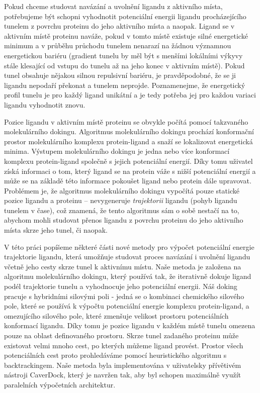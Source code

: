 Pokud chceme studovat navázání a uvolnění ligandu z aktivního místa, potřebujeme
být schopni vyhodnotit potenciální energii ligandu procházejícího tunelem
z povrchu proteinu do jeho aktivního místa a naopak. Ligand se v aktivním
místě proteinu naváže, pokud v tomto místě existuje silné energetické minimum
a v průběhu průchodu tunelem nenarazí na žádnou významnou energetickou bariéru
(gradient tunelu by měl být s menšími lokálními výkyvy stále klesající od
vstupu do tunelu až na jeho konec v aktivním místě). Pokud tunel obsahuje nějakou
silnou repulsivní bariéru, je pravděpodobné, že se ji ligandu nepodaří překonat
a tunelem neprojde. Poznamenejme, že energetický profil tunelu je pro každý
ligand unikátní a je tedy potřeba jej pro každou variaci ligandu vyhodnotit
znovu.

Pozice ligandu v aktivním místě proteinu se obvykle počítá pomocí takzvaného
molekulárního dokingu. Algoritmus molekulárního dokingu prochází konformační
prostor molekulárního komplexu protein-ligand a snaží se lokalizovat energetická
minima. Výstupem molekulárního dokingu je jedna nebo více konformací komplexu protein-ligand
společně s jejich potenciální energií. Díky tomu
uživatel získá informaci o tom, který ligand se na protein váže s nižší potenciální
energií a může se na základě této informace pokoušet ligand nebo protein
dále upravovat. Problémem je, že algoritmus molekulárního dokingu vypočítá pouze
statické pozice ligandu a proteinu – nevygeneruje \textit{trajektorii} ligandu
(pohyb ligandu tunelem v čase), což znamená, že tento algoritmus sám o sobě
nestačí na to, abychom mohli studovat přenos ligandu z povrchu proteinu
do jeho aktivního místa skrze jeho tunel, či naopak.

V této práci popíšeme některé části nové metody pro výpočet potenciální energie
trajektorie ligandu, která umožňuje studovat proces navázání i uvolnění ligandu
včetně jeho cesty skrze tunel k aktivnímu místu. Naše metoda je založena na
algoritmu molekulárního dokingu, který používá tak, že iterativně dokuje ligand
podél trajektorie tunelu a vyhodnocuje jeho potenciální energii. Náš doking
pracuje s hybridními silovými poli - jedná se o kombinaci chemického silového
pole, které se používá k výpočtu potenciální energie komplexu protein-ligand,
a omezujícího silového pole, které zmenšuje velikost prostoru potenciálních
konformací ligandu. Díky tomu je pozice ligandu v každém místě tunelu
omezena pouze na oblast definovaného prostoru. Skrze tunel zadaného proteinu
může existovat velmi mnoho cest, po kterých můžeme ligand provést. Prostor
všech potenciálních cest proto prohledáváme pomocí heuristického algoritmu
s backtrackingem. Naše metoda byla implementována v uživatelsky přívětivém
nástroji CaverDock, který je navržen tak, aby byl schopen maximálně využít
paralelních výpočetních architektur.


